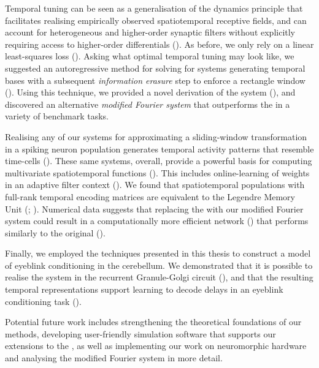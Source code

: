 Temporal tuning can be seen as a generalisation of the \NEF dynamics principle that facilitates realising empirically observed spatiotemporal receptive fields, and can account for heterogeneous and higher-order synaptic filters without explicitly requiring access to higher-order differentials ().
As before, we only rely on a linear least-squares loss ().
Asking what optimal temporal tuning may look like, we suggested an autoregressive method for solving for \LTI systems generating temporal bases with a subsequent \emph{information erasure} step to enforce a rectangle window ().
Using this technique, we provided a novel derivation of the \LDN system (), and discovered an alternative \emph{modified Fourier system} that outperforms the \LDN in a variety of benchmark tasks.

Realising any of our \LTI systems for approximating a sliding-window transformation in a spiking neuron population generates temporal activity patterns that resemble time-cells ().
These same systems, overall, provide a powerful basis for computing multivariate spatiotemporal functions ().
This includes online-learning of weights in an adaptive filter context ().
We found that spatiotemporal \NEF populations with full-rank temporal encoding matrices are equivalent to the Legendre Memory Unit (\LMU; \cite{voelker2019lmu}).
Numerical data suggests that replacing the \LDN with our modified Fourier system could result in a computationally more efficient network () that performs similarly to the original \LMU ().

Finally, we employed the techniques presented in this thesis to construct a model of eyeblink conditioning in the cerebellum.
We demonstrated that it is possible to realise the \LDN system in the recurrent Granule-Golgi circuit (), and that the resulting temporal representations support learning to decode delays in an eyeblink conditioning task ().

Potential future work includes strengthening the theoretical foundations of our methods, developing user-friendly simulation software that supports our extensions to the \NEF, as well as implementing our work on neuromorphic hardware and analysing the modified Fourier system in more detail.


